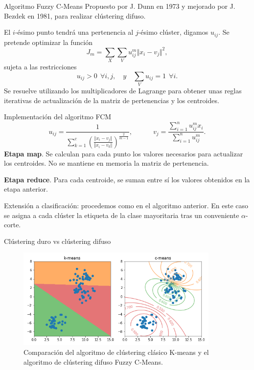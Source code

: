 \documentclass[10pt, spanish]{beamer}
\begin{document}
\begin{frame}{Algoritmo Fuzzy C-Means}
  Propuesto por J. Dunn en 1973 y mejorado por J. Bezdek en 1981, para realizar clústering difuso.

  El $i$-ésimo punto tendrá una pertenencia al $j$-ésimo clúster, digamos $u_{ij}$. Se pretende optimizar la función
  \[
    J_m = \sum_{X}\sum_{V} u_{ij}^m\Vert x_i - v_j \Vert^2,
  \]
  sujeta a las restricciones
  \[
    u_{ij}>0 \ \ \forall i, j, \quad y \quad \sum_{V}u_{ij} =1 \ \ \forall i.
  \]
  Se resuelve utilizando los multiplicadores de Lagrange para obtener unas reglas iterativas de actualización de la matriz de pertenencias y los centroides.
\end{frame}

\begin{frame}{Implementación del algoritmo FCM}
  \[
u_{ij}= \dfrac{1}{\displaystyle \sum_{k=1}^c \left( \frac{\Vert x_i - v_j \Vert}{\Vert x_i - v_k \Vert} \right)^{\frac{2}{m-1}}}, \quad \quad \quad v_j = \dfrac{\displaystyle\sum_{i=1}^n u_{ij}^m x_i}{\displaystyle\sum_{i=1}^n u_{ij}^m}.
  \]
  \textbf{Etapa map}. Se calculan para cada punto los valores necesarios para actualizar los centroides. No se mantiene en memoria la matriz de pertenencia.

  \textbf{Etapa reduce}. Para cada centroide, se suman entre sí los valores obtenidos en la etapa anterior.

  Extensión a clasificación: procedemos como en el algoritmo anterior. En este caso se asigna a cada clúster la etiqueta de la clase mayoritaria tras un conveniente $\alpha$-corte.
\end{frame}

\begin{frame}{Clústering duro vs clústering difuso}
  \begin{figure}
	\centering
	\includegraphics[width=27em]{img/cmeans}
	\caption{\footnotesize Comparación del algoritmo de clústering clásico K-means y el algoritmo de clústering difuso Fuzzy C-Means.}
\end{figure}
\end{frame}
\end{document}
